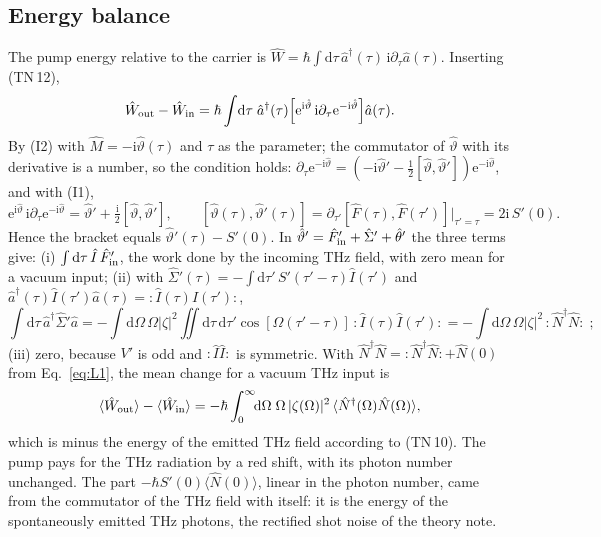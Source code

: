 \documentclass[aps,pra,onecolumn,notitlepage,11pt,amsmath,amssymb,nofootinbib]{revtex4-2}
\newcommand{\Nop}{\hat N}
\newcommand{\Iop}{\hat I}
\newcommand{\dd}{\mathrm{d}}
\newcommand{\ee}{\mathrm{e}}
\newcommand{\ii}{\mathrm{i}}
\begin{document}
\subsection{Energy balance}

The pump energy relative to the carrier is
$\hat W=\hbar\int\dd\tau\,\hat a^\dagger(\tau)\,\ii\partial_\tau\hat a(\tau)$.
Inserting (TN\,12),
\begin{equation}
\hat W_{\rm out}-\hat W_{\rm in}
=\hbar\int\!\dd\tau\;\hat a^\dagger(\tau)\Big[\ee^{\ii\hat\vartheta}\,\ii\partial_\tau\ee^{-\ii\hat\vartheta}\Big]\hat a(\tau).
\end{equation}
By (I2) with $\hat M=-\ii\hat\vartheta(\tau)$ and $\tau$ as the parameter; the
commutator of $\hat\vartheta$ with its derivative is a number, so the
condition holds:
$\partial_\tau\ee^{-\ii\hat\vartheta}
=(-\ii\hat\vartheta'-\tfrac12[\hat\vartheta,\hat\vartheta'])\ee^{-\ii\hat\vartheta}$,
and with (I1),
\begin{equation}
\ee^{\ii\hat\vartheta}\,\ii\partial_\tau\ee^{-\ii\hat\vartheta}
=\hat\vartheta'+\tfrac{\ii}{2}[\hat\vartheta,\hat\vartheta'],\qquad
[\hat\vartheta(\tau),\hat\vartheta'(\tau)]
=\partial_{\tau'}[\hat F(\tau),\hat F(\tau')]\big|_{\tau'=\tau}=2\ii\,S'(0).
\end{equation}
Hence the bracket equals $\hat\vartheta'(\tau)-S'(0)$. In
$\hat\vartheta'=\hat F_{\rm in}'+\hat\Sigma'+\hat\theta'$ the three terms give:
(i) $\int\dd\tau\,\Iop\,\hat F_{\rm in}'$, the work done by the incoming THz
field, with zero mean for a vacuum input; (ii) with
$\hat\Sigma'(\tau)=-\int\dd\tau'\,S'(\tau'-\tau)\Iop(\tau')$ and
$\hat a^\dagger(\tau)\Iop(\tau')\hat a(\tau)={:}\Iop(\tau)\Iop(\tau'){:}$,
\begin{equation}
\int\!\dd\tau\,\hat a^\dagger\hat\Sigma'\hat a
=-\int\!\dd\Omega\,\Omega|\zeta|^2\iint\!\dd\tau\,\dd\tau'\cos[\Omega(\tau'-\tau)]\,{:}\Iop(\tau)\Iop(\tau'){:}
=-\int\!\dd\Omega\,\Omega|\zeta|^2\,{:}\Nop^\dagger\Nop{:}\;;
\end{equation}
(iii) zero, because $V'$ is odd and ${:}\Iop\Iop{:}$ is symmetric. With
$\Nop^\dagger\Nop={:}\Nop^\dagger\Nop{:}+\Nop(0)$ from Eq.~\eqref{eq:L1}, the
mean change for a vacuum THz input is
\begin{equation}
\langle\hat W_{\rm out}\rangle-\langle\hat W_{\rm in}\rangle
=-\hbar\int_0^\infty\!\!\dd\Omega\;\Omega\,|\zeta(\Omega)|^2\,
\langle\Nop^\dagger(\Omega)\Nop(\Omega)\rangle ,
\end{equation}
which is minus the energy of the emitted THz field according to (TN\,10).
The pump pays for the THz radiation by a red shift, with its photon number
unchanged. The part $-\hbar S'(0)\langle\Nop(0)\rangle$, linear in the photon
number, came from the commutator of the THz field with itself: it is the
energy of the spontaneously emitted THz photons, the rectified shot noise of
the theory note.
\end{document}
